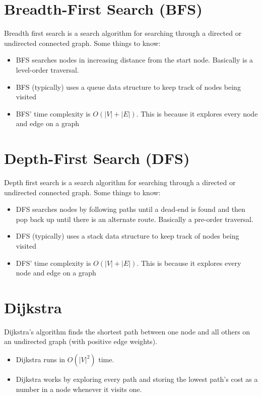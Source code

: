 \documentclass{article}
\begin{document}
\section{Breadth-First Search (BFS)}
Breadth first search is a search algorithm for searching through a directed or undirected connected graph. Some things to know:

\begin{itemize}
    \item BFS searches nodes in increasing distance from the start node. Basically is a level-order traversal.
    \item BFS (typically) uses a queue data structure to keep track of nodes being visited
    \item BFS' time complexity is $O(|V|+|E|)$. This is because it explores every node and edge on a graph
\end{itemize}

\section{Depth-First Search (DFS)}
Depth first search is a search algorithm for searching through a directed or undirected connected graph. Some things to know:

\begin{itemize}
    \item DFS searches nodes by following paths until a dead-end is found and then pop back up until there is an alternate route. Basically a pre-order traversal. 
    \item DFS (typically) uses a stack data structure to keep track of nodes being visited
    \item DFS' time complexity is $O(|V|+|E|)$. This is because it explores every node and edge on a graph
\end{itemize}

\section{Dijkstra}
Dijkstra's algorithm finds the shortest path between one node and all others on an undirected graph (with positive edge weights). 
\begin{itemize}
    \item Dijkstra runs in $O(|V|^2)$ time.
    \item Dijkstra works by exploring every path and storing the lowest path's cost as a number in a node whenever it visits one.
\end{itemize}
\end{document}
